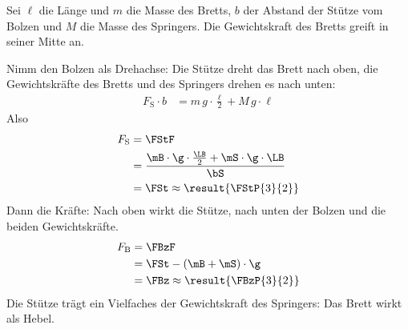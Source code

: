 Sei $\ell$ die Länge und $m$ die Masse des Bretts, $b$ der Abstand der Stütze vom Bolzen und $M$ die Masse des Springers. Die Gewichtskraft des Bretts greift in seiner Mitte an.

Nimm den Bolzen als Drehachse: Die Stütze dreht das Brett nach oben, die Gewichtskräfte des Bretts und des Springers drehen es nach unten:
\begin{align}
 F_\mathrm{S}\cdot b &= m\,g\cdot\frac{\ell}{2} + M\,g\cdot\ell
\end{align}
Also
\begin{align}
 F_\mathrm{S} &= \FStF \\
   &= \frac{\mB\cdot\g\cdot\frac{\LB}{2}+\mS\cdot\g\cdot\LB}{\bS} \\
   &= \FSt \approx \result{\FStP{3}{2}}
\end{align}
Dann die Kräfte: Nach oben wirkt die Stütze, nach unten der Bolzen und die beiden Gewichtskräfte.
\begin{align}
 F_\mathrm{B} &= \FBzF \\
   &= \FSt-(\mB+\mS)\cdot\g \\
   &= \FBz \approx \result{\FBzP{3}{2}}
\end{align}
Die Stütze trägt ein Vielfaches der Gewichtskraft des Springers: Das Brett wirkt als Hebel.
